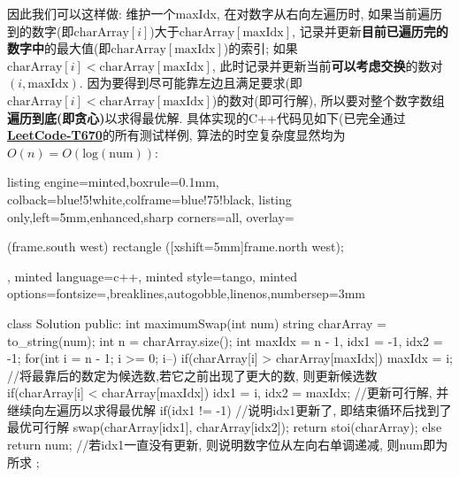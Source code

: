 \documentclass{article}
\begin{document}
\begin{homeworkProblem}
    因此我们可以这样做: 维护一个maxIdx, 在对数字从右向左遍历时, 如果当前遍历到的数字(即$\text{charArray}[i]$)大于$\text{charArray}[\text{maxIdx}]$, 记录并更新\textbf{目前已遍历完的数字中}的最大值(即$\text{charArray}[\text{maxIdx}]$)的索引; 如果$\text{charArray}[i]<\text{charArray}[\text{maxIdx}]$, 此时记录并更新当前\textbf{可以考虑交换}的数对$(i,\text{maxIdx})$. 因为要得到尽可能靠左边且满足要求(即$\text{charArray}[i]< \text{charArray}[\text{maxIdx}]$)的数对(即可行解), 所以要对整个数字数组\textbf{遍历到底(即贪心)}以求得最优解. 具体实现的C++代码见如下(已完全通过\href{https://leetcode.cn/problems/maximum-swap/description/}{\textbf{LeetCode-T670}}的所有测试样例, 算法的时空复杂度显然均为$O(n)=O(\text{log}(\text{num}))$:
\begin{tcblisting}{listing engine=minted,boxrule=0.1mm,
colback=blue!5!white,colframe=blue!75!black,
listing only,left=5mm,enhanced,sharp corners=all,
overlay={\begin{tcbclipinterior} (frame.south west)
rectangle ([xshift=5mm]frame.north west);\end{tcbclipinterior}},
minted language=c++,
minted style=tango,
minted options={fontsize=\small,breaklines,autogobble,linenos,numbersep=3mm}}
class Solution {
public:
    int maximumSwap(int num) {
        string charArray = to_string(num);
        int n = charArray.size();
        int maxIdx = n - 1, idx1 = -1, idx2 = -1;
        for(int i = n - 1; i >= 0; i--) {
            if(charArray[i] > charArray[maxIdx]) {
                maxIdx = i; //将最靠后的数定为候选数,若它之前出现了更大的数, 则更新候选数
            }
            if(charArray[i] < charArray[maxIdx]) {
                idx1 = i, idx2 = maxIdx; //更新可行解, 并继续向左遍历以求得最优解
            }
        }
        if(idx1 != -1) {  //说明idx1更新了, 即结束循环后找到了最优可行解
            swap(charArray[idx1], charArray[idx2]);
            return stoi(charArray);
        }
        else return num; //若idx1一直没有更新, 则说明数字位从左向右单调递减, 则num即为所求
    }
};
\end{tcblisting}
\end{homeworkProblem}



\pagebreak
\end{document}
